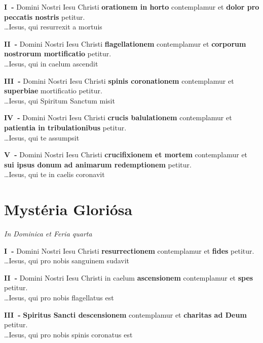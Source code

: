 \documentclass[paper=a5,pagesize=pdftex,fontsize=10pt,headinclude=on,twoside=off]{scrbook}
\newcommand{\mysterium}[1]{\textbf{#1}}
\newcommand{\mysteriumnumero}[1]{\textbf{#1~-}}
\newcommand{\fructum}[1]{\textbf{#1}}
\newcommand{\dies}[1]{\vspace{-0.6cm}\begin{center}\textit{\tiny#1}\end{center}\vspace{-0.1cm}}
\begin{document}
\mysteriumnumero{I} Domini Nostri Iesu Christi \mysterium{orationem in horto} contemplamur et \fructum{dolor pro peccatis nostris} petitur.\\
\hspace*{0pt}\hfill \ldots Iesus, qui resurrexit a mortuis

\mysteriumnumero{II} Domini Nostri Iesu Christi \mysterium{flagellationem} contemplamur et \fructum{corporum nostrorum mortificatio} petitur.\\
\hspace*{0pt}\hfill \ldots Iesus, qui in caelum ascendit

\mysteriumnumero{III} Domini Nostri Iesu Christi \mysterium{spinis coronationem} contemplamur et \fructum{superbiae} mortificatio petitur.\\
\hspace*{0pt}\hfill \ldots Iesus, qui Spiritum Sanctum misit

\mysteriumnumero{IV} Domini Nostri Iesu Christi \mysterium{crucis balulationem} contemplamur et \fructum{patientia in tribulationibus} petitur.\\
\hspace*{0pt}\hfill \ldots Iesus, qui te assumpsit

\mysteriumnumero{V} Domini Nostri Iesu Christi \mysterium{crucifixionem et mortem} contemplamur et \fructum{sui ipsus donum ad animarum redemptionem} petitur.\\
\hspace*{0pt}\hfill \ldots Iesus, qui te in caelis coronavit

\newpage 

\section{Mystéria Gloriósa}
\dies{In Dominica et Feria quarta}

\mysteriumnumero{I} Domini Nostri Iesu Christi \mysterium{resurrectionem} contemplamur et \fructum{fides} petitur.\\
\hspace*{0pt}\hfill \ldots Iesus, qui pro nobis sanguinem sudavit

\mysteriumnumero{II} Domini Nostri Iesu Christi in caelum \mysterium{ascensionem} contemplamur et \fructum{spes} petitur.\\
\hspace*{0pt}\hfill \ldots Iesus, qui pro nobis flagellatus est

\mysteriumnumero{III} \mysterium{Spiritus Sancti descensionem} contemplamur et \fructum{charitas ad Deum} petitur.\\
\hspace*{0pt}\hfill \ldots Iesus, qui pro nobis spinis coronatus est
\end{document}
